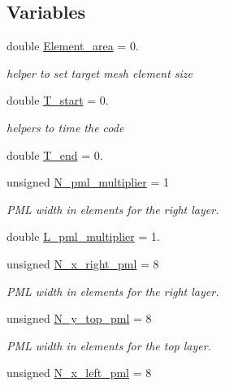 \subsection*{Variables}
\begin{DoxyCompactItemize}
\item 
double \hyperlink{namespaceGlobal__Parameters_af365b0769e142cabdaed848057332858}{Element\+\_\+area} = 0.
\begin{DoxyCompactList}\small\item\em helper to set target mesh element size \end{DoxyCompactList}\item 
double \hyperlink{namespaceGlobal__Parameters_a6106a50c4a420f4040e2ccd7d443267c}{T\+\_\+start} = 0.
\begin{DoxyCompactList}\small\item\em helpers to time the code \end{DoxyCompactList}\item 
double \hyperlink{namespaceGlobal__Parameters_a42ef00f24f3bc5c16dae72557c736634}{T\+\_\+end} = 0.
\item 
unsigned \hyperlink{namespaceGlobal__Parameters_a9af8f57814ac363b52f2a88d75864524}{N\+\_\+pml\+\_\+multiplier} = 1
\begin{DoxyCompactList}\small\item\em P\+ML width in elements for the right layer. \end{DoxyCompactList}\item 
double \hyperlink{namespaceGlobal__Parameters_a7a49a7bc4052082ccf10caf8ff7a52b6}{L\+\_\+pml\+\_\+multiplier} = 1.
\item 
unsigned \hyperlink{namespaceGlobal__Parameters_a401ab27b40efe725bc047909ae65b4b1}{N\+\_\+x\+\_\+right\+\_\+pml} = 8
\begin{DoxyCompactList}\small\item\em P\+ML width in elements for the right layer. \end{DoxyCompactList}\item 
unsigned \hyperlink{namespaceGlobal__Parameters_ade86fec7e40fc9a5330e6213482f09d6}{N\+\_\+y\+\_\+top\+\_\+pml} = 8
\begin{DoxyCompactList}\small\item\em P\+ML width in elements for the top layer. \end{DoxyCompactList}\item 
unsigned \hyperlink{namespaceGlobal__Parameters_accf11b5794502b15efd0aa37347f6994}{N\+\_\+x\+\_\+left\+\_\+pml} = 8

\end{DoxyCompactItemize}
